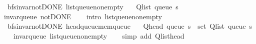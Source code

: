 \begin{isabellebody}
\isanewline
%
\endisadeliminvisible
%
\isataginvisible
{}\isamarkupfalse%
\ {\isacharparenleft}{\kern0pt}\ bfs{\isacharunderscore}{\kern0pt}invar{\isacharunderscore}{\kern0pt}not{\isacharunderscore}{\kern0pt}DONE{\isacharparenright}{\kern0pt}\ list{\isacharunderscore}{\kern0pt}queue{\isacharunderscore}{\kern0pt}non{\isacharunderscore}{\kern0pt}empty{\isacharcolon}{\kern0pt}\isanewline
\ \ \ {\isachardoublequoteopen}Q{\isacharunderscore}{\kern0pt}list\ {\isacharparenleft}{\kern0pt}queue\ s{\isacharparenright}{\kern0pt}\ {\isasymnoteq}\ {\isacharbrackleft}{\kern0pt}{\isacharbrackright}{\kern0pt}{\isachardoublequoteclose}%
\endisataginvisible
{\isafoldinvisible}%
%
\isadeliminvisible
\isanewline
%
\endisadeliminvisible
%
\isadelimproof
\ \ %
\endisadelimproof
%
\isatagproof
{}\isamarkupfalse%
\ invar{\isacharunderscore}{\kern0pt}queue\ not{\isacharunderscore}{\kern0pt}DONE\isanewline
\ \ \isamarkupfalse%
\ {\isacharparenleft}{\kern0pt}intro\ list{\isacharunderscore}{\kern0pt}queue{\isacharunderscore}{\kern0pt}non{\isacharunderscore}{\kern0pt}empty{\isacharparenright}{\kern0pt}%
\endisatagproof
{\isafoldproof}%
%
\isadelimproof
\isanewline
%
\endisadelimproof
%
\isadeliminvisible
\isanewline
%
\endisadeliminvisible
%
\isataginvisible
{}\isamarkupfalse%
\ {\isacharparenleft}{\kern0pt}\ bfs{\isacharunderscore}{\kern0pt}invar{\isacharunderscore}{\kern0pt}not{\isacharunderscore}{\kern0pt}DONE{\isacharparenright}{\kern0pt}\ head{\isacharunderscore}{\kern0pt}queue{\isacharunderscore}{\kern0pt}mem{\isacharunderscore}{\kern0pt}queue{\isacharcolon}{\kern0pt}\isanewline
\ \ \ {\isachardoublequoteopen}Q{\isacharunderscore}{\kern0pt}head\ {\isacharparenleft}{\kern0pt}queue\ s{\isacharparenright}{\kern0pt}\ {\isasymin}\ set\ {\isacharparenleft}{\kern0pt}Q{\isacharunderscore}{\kern0pt}list\ {\isacharparenleft}{\kern0pt}queue\ s{\isacharparenright}{\kern0pt}{\isacharparenright}{\kern0pt}{\isachardoublequoteclose}%
\endisataginvisible
{\isafoldinvisible}%
%
\isadeliminvisible
\isanewline
%
\endisadeliminvisible
%
\isadelimproof
\ \ %
\endisadelimproof
%
\isatagproof
{}\isamarkupfalse%
\ invar{\isacharunderscore}{\kern0pt}queue\ list{\isacharunderscore}{\kern0pt}queue{\isacharunderscore}{\kern0pt}non{\isacharunderscore}{\kern0pt}empty\isanewline
\ \ \isamarkupfalse%
\ {\isacharparenleft}{\kern0pt}simp\ add{\isacharcolon}{\kern0pt}\ Q{\isachardot}{\kern0pt}list{\isacharunderscore}{\kern0pt}head{\isacharparenright}{\kern0pt}%

\end{isabellebody}
